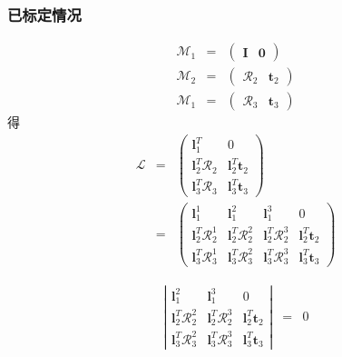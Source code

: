 \documentclass{beamer}
\newcommand{\tmmathbf}[1]{\ensuremath{\boldsymbol{#1}}}
\begin{document}
{{\begin{frame}
  \frametitle{已标定情况}
  \begin{eqnarray*}
    \mathcal{M}_1 & = & \left(\begin{array}{cc}
      \tmmathbf{I} & \tmmathbf{0}
    \end{array}\right)\\
    \mathcal{M}_2 & = & \left(\begin{array}{cc}
      \mathcal{R}_2 & \tmmathbf{t}_2
    \end{array}\right)\\
    \mathcal{M}_1 & = & \left(\begin{array}{cc}
      \mathcal{R}_3 & \tmmathbf{t}_3
    \end{array}\right)
  \end{eqnarray*}
  得
  \begin{eqnarray*}
    \mathcal{L} & = & \left(\begin{array}{cc}
      \tmmathbf{l}_1^T & 0\\
      \tmmathbf{l}_2^T \mathcal{R}_2 & \tmmathbf{l}_2^T \tmmathbf{t}_2\\
      \tmmathbf{l}_3^T \mathcal{R}_3 & \tmmathbf{l}_3^T \tmmathbf{t}_3
    \end{array}\right)\\
    & = & \left(\begin{array}{cccc}
      \tmmathbf{l}_1^1 & \tmmathbf{l}_1^2 & \tmmathbf{l}_1^3 & 0\\
      \tmmathbf{l}_2^T \mathcal{R}_2^1 & \tmmathbf{l}_2^T \mathcal{R}_2^2 &
      \tmmathbf{l}_2^T \mathcal{R}_2^3 & \tmmathbf{l}_2^T \tmmathbf{t}_2\\
      \tmmathbf{l}_3^T \mathcal{R}_3^1 & \tmmathbf{l}_3^T \mathcal{R}_3^2 &
      \tmmathbf{l}_3^T \mathcal{R}_3^3 & \tmmathbf{l}_3^T \tmmathbf{t}_3
    \end{array}\right)
  \end{eqnarray*}
\end{frame}}{\begin{frame}
  \begin{eqnarray*}
    \left|\begin{array}{ccc}
      \tmmathbf{l}_1^2 & \tmmathbf{l}_1^3 & 0\\
      \tmmathbf{l}_2^T \mathcal{R}_2^2 & \tmmathbf{l}_2^T \mathcal{R}_2^3 &
      \tmmathbf{l}_2^T \tmmathbf{t}_2\\
      \tmmathbf{l}_3^T \mathcal{R}_3^2 & \tmmathbf{l}_3^T \mathcal{R}_3^3 &
      \tmmathbf{l}_3^T \tmmathbf{t}_3
    \end{array}\right| & = & 0\\

\end{eqnarray*}
\end{frame}}}
\end{document}
